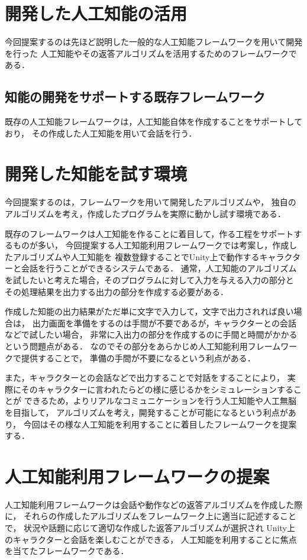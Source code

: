 \section{開発した人工知能の活用}
今回提案するのは先ほど説明した一般的な人工知能フレームワークを用いて開発を行った
人工知能やその返答アルゴリズムを活用するためのフレームワークである．
\subsection{知能の開発をサポートする既存フレームワーク}
既存の人工知能フレームワークは，人工知能自体を作成することをサポートしており，
その作成した人工知能を用いて会話を行う．

\section{開発した知能を試す環境}
今回提案するのは，フレームワークを用いて開発したアルゴリズムや，
独自のアルゴリズムを考え，作成したプログラムを実際に動かし試す環境である．

既存のフレームワークは人工知能を作ることに着目して，作る工程をサポートするものが多い，
今回提案する人工知能利用フレームワークでは考案し，作成したアルゴリズムや人工知能を
複数登録することでUnity上で動作するキャラクターと会話を行うことができるシステムである．
通常，人工知能のアルゴリズムを試したいと考えた場合，そのプログラムに対して入力を与える入力の部分と
その処理結果を出力する出力の部分を作成する必要がある．

作成した知能の出力結果がただ単に文字で入力して，文字で出力されれば良い場合は，
出力画面を準備をするのは手間が不要であるが，キャラクターとの会話などで試したい場合，
非常に入出力の部分を作成するのに手間と時間がかかるという問題点がある．
なのでその部分をあらかじめ人工知能利用フレームワークで提供することで，
準備の手間が不要になるという利点がある．

また，キャラクターとの会話などで出力することで対話をすることにより，
実際にそのキャラクターに言われたらどの様に感じるかをシミュレーションすることが
できるため，よりリアルなコミュニケーションを行う人工知能や人工無脳を目指して，
アルゴリズムを考え，開発することが可能になるという利点があり，
今回はその様な人工知能を利用することに着目したフレームワークを提案する．
\section{人工知能利用フレームワークの提案}
人工知能利用フレームワークは会話や動作などの返答アルゴリズムを作成した際に，
それらの作成したアルゴリズムをフレームワーク上に適当に記述することで，
状況や話題に応じて適切な作成した返答アルゴリズムが選択され
Unity上のキャラクターと会話を楽しむことができる，
人工知能を利用することに焦点を当てたフレームワークである．
